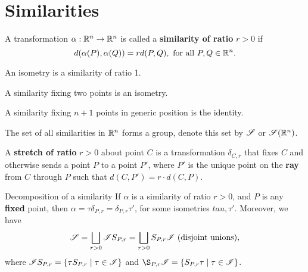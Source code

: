 \section{Similarities}

\begin{definition}
    A transformation \(\alpha: \mathbb{R}^n \to \mathbb{R}^n\) is called a \textbf{similarity of ratio} \(r > 0\) if \[d(\alpha(P), \alpha(Q)) = rd(P, Q), \text{ for all } P, Q \in \mathbb{R}^n.\]
\end{definition}

\begin{proposition}
    \begin{statements}{}
        \item An isometry is a similarity of ratio 1.
        \item A similarity fixing two points is an isometry.
        \item A similarity fixing \(n + 1\) points in generic position is the identity.
        \item The set of all similarities in \(\mathbb{R}^n\) forms a group, denote this set by \(\mathscr{S}\) or \(\mathscr{S}(\mathbb{R}^n)\).
    \end{statements}
\end{proposition}

\begin{definition}
    A \textbf{stretch of ratio} \(r > 0\) about point \(C\) is a transformation \(\delta_{C, r}\) that fixes \(C\) and otherwise sends a point \(P\) to a point \(P'\), where \(P'\) is the unique point on the \textbf{ray} from \(C\) through \(P\) such that \(d(C, P') = r \cdot d(C, P)\).
\end{definition}



\begin{theorem}{Decomposition of a similarity}
    If \(\alpha\) is a similarity of ratio \(r > 0\), and \(P\) is any \textbf{fixed} point, then \(\alpha = \tau\delta_{P, r} = \delta_{P, r}\tau'\), for some isometries \(tau, \tau'\). Moreover, we have
    \[\mathscr{S} = \bigsqcup_{r > 0} \mathscr{I} S_{P, r} = \bigsqcup_{r > 0} S_{P, r} \mathscr{I} \text{ (disjoint unions)},\]
    where \(\mathscr{I} S_{P, r} = \{\tau S_{P ,r } \mid \tau \in \mathscr{I} \}\) and \(\S_{P, r} \scrI = \{ S_{P, r} \tau \mid \tau \in \scrI\}\).
\end{theorem}

